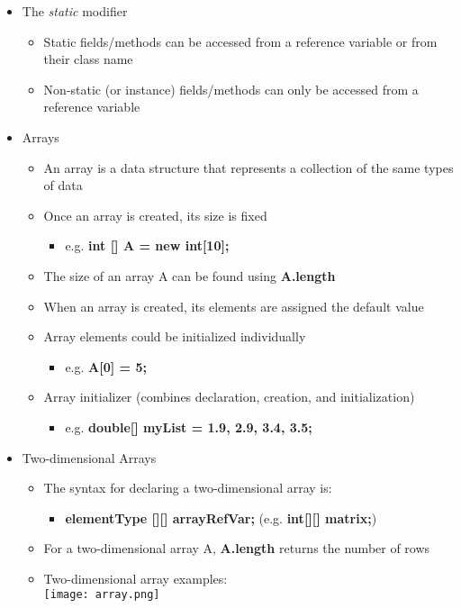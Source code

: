 \documentclass[11pt]{article}
\begin{document}
\begin{itemize}
	\item The \textit{static} modifier
		\begin{itemize}
			\item Static fields/methods can be accessed from a reference variable or
			from their class name
			\item Non-static (or instance) fields/methods can only be accessed from a reference variable
		\end{itemize}

	\item Arrays
		\begin{itemize}
			\item An array is a data structure that represents a collection of the same types of data
			\item Once an array is created, its size is fixed
				\begin{itemize}
					\item e.g. \textbf{int [] A = new int[10];}
				\end{itemize}
			\item The size of an array A can be found using \textbf{A.length}
			\item When an array is created, its elements are assigned the default value
			\item Array elements could be initialized individually
				\begin{itemize}
					\item e.g. \textbf{A[0] = 5;}
				\end{itemize}
			\item Array initializer (combines declaration, creation, and initialization)
				\begin{itemize}
					\item e.g. \textbf{double[] myList = {1.9, 2.9, 3.4, 3.5};}
				\end{itemize}
		\end{itemize}

	\item Two-dimensional Arrays
		\begin{itemize}
			\item The syntax for declaring a two-dimensional array is:
				\begin{itemize}
					\item \textbf{elementType [][] arrayRefVar;} (e.g. \textbf{int[][] matrix;})
				\end{itemize}
			\item For a two-dimensional array A, \textbf{A.length} returns the number of rows
			\item Two-dimensional array examples:\\
				\texttt{[image: array.png]}
		\end{itemize}
\end{itemize}
\end{document}
